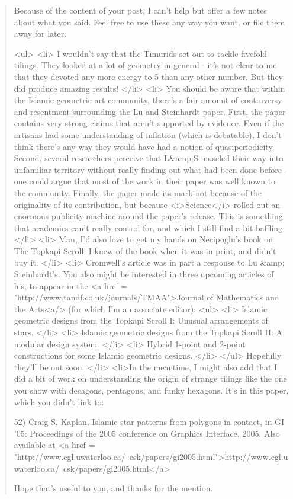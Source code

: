 \begin{quote}

 Because of the content of your post, I can't help but offer a few
notes about what you said.  Feel free to use these any way you want,
or file them away for later.

<ul>
<li>
I wouldn't say that the Timurids set out to tackle fivefold tilings.
  They looked at a lot of geometry in general - it's not clear to
  me that they devoted any more energy to 5 than any other number.
  But they did produce amazing results!
</li>
<li>
You should be aware that within the Islamic geometric art
  community, there's a fair amount of controversy and resentment
  surrounding the Lu and Steinhardt paper.  First, the paper
  contains very strong claims that aren't supported by evidence.
  Even if the artisans had some understanding of inflation (which
  is debatable), I don't think there's any way they would have had
  a notion of quasiperiodicity.  Second, several researchers
  perceive that L&amp;S muscled their way into unfamiliar territory
  without really finding out what had been done before - one could
  argue that most of the work in their paper was well known to the
  community.  Finally, the paper made its mark not because of the
  originality of its contribution, but because <i>Science</i> rolled out
  an enormous publicity machine around the paper's release.  This
  is something that academics can't really control for, and which
  I still find a bit baffling.
</li>
<li>
Man, I'd also love to get my hands on Necipoglu's book on The
  Topkapi Scroll.  I knew of the book when it was in print, and
  didn't buy it.  
</li>
<li>
Cromwell's article was in part a response to Lu &amp; Steinhardt's.
  You also might be interested in three upcoming articles of his,
  to appear in the <a href = "http://www.tandf.co.uk/journals/TMAA">Journal 
  of Mathematics and the Arts<a/> (for which I'm an associate editor):
<ul>
<li>
    Islamic geometric designs from the Topkapi Scroll I:
    Unusual arrangements of stars.
</li>
<li>
    Islamic geometric designs from the Topkapi Scroll II:
    A modular design system.
</li>
<li>
    Hybrid 1-point and 2-point constructions for some Islamic
    geometric designs.
</li>
</ul>
  Hopefully they'll be out soon.
</li>
<li>In the meantime, I might also add that I did a bit of work on
  understanding the origin of strange tilings like the one you
  show with decagons, pentagons, and funky hexagons.  It's in
  this paper, which you didn't link to:

52) Craig S. Kaplan, Islamic star patterns from polygons in contact,
in GI '05: Proceedings of the 2005 conference on Graphics Interface, 2005. 
Also available at
<a href = "http://www.cgl.uwaterloo.ca/~csk/papers/gi2005.html">http://www.cgl.uwaterloo.ca/~csk/papers/gi2005.html</a>

Hope that's useful to you, and thanks for the mention.

\end{quote}
    

